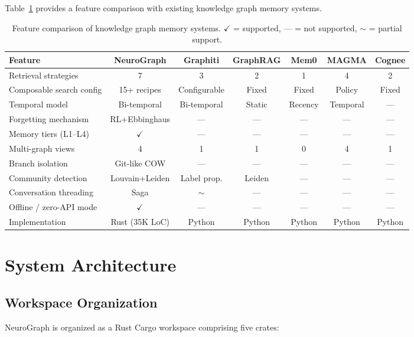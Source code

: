 \documentclass[11pt,a4paper,twocolumn]{article}
\begin{document}
Table~\ref{tab:comparison} provides a feature comparison with
existing knowledge graph memory systems.

\begin{table}[t]
\centering
\caption{Feature comparison of knowledge graph memory systems.
$\checkmark$ = supported, --- = not supported,
$\sim$ = partial support.}
\label{tab:comparison}
\small
\begin{tabular}{lcccccc}
\toprule
\textbf{Feature} & \textbf{NeuroGraph} & \textbf{Graphiti} &
\textbf{GraphRAG} & \textbf{Mem0} & \textbf{MAGMA} & \textbf{Cognee} \\
\midrule
Retrieval strategies & 7 & 3 & 2 & 1 & 4 & 2 \\
Composable search config & 15+ recipes & Configurable & Fixed & Fixed
& Policy & Fixed \\
Temporal model & Bi-temporal & Bi-temporal & Static & Recency
& Temporal & --- \\
Forgetting mechanism & RL+Ebbinghaus & --- & --- & --- & --- & --- \\
Memory tiers (L1--L4) & $\checkmark$ & --- & --- & --- & --- & --- \\
Multi-graph views & 4 & 1 & 1 & 0 & 4 & 1 \\
Branch isolation & Git-like COW & --- & --- & --- & --- & --- \\
Community detection & Louvain+Leiden & Label prop. & Leiden & ---
& --- & --- \\
Conversation threading & Saga & $\sim$ & --- & --- & --- & --- \\
Offline / zero-API mode & $\checkmark$ & --- & --- & --- & --- & --- \\
Implementation & Rust (35K LoC) & Python & Python & Python
& Python & Python \\
\bottomrule
\end{tabular}
\end{table}

\section{System Architecture}
\label{sec:architecture}

\subsection{Workspace Organization}

NeuroGraph is organized as a Rust Cargo workspace comprising five
crates:
\end{document}
